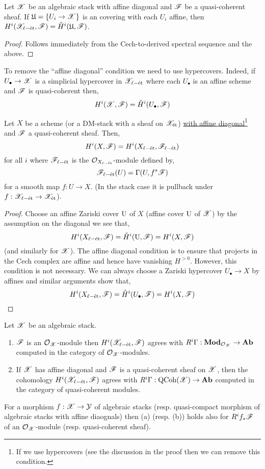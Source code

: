 \documentclass[12pt]{article}
\begin{document}
\begin{prop}
Let $\mathscr{X}$ be an algebraic stack with affine diagonal and $\mathscr{F}$ be a quasi-coherent sheaf. If $\mathfrak{U} = \{U_i \to \mathscr{X} \}$ is an \etale covering with each $U_i$ affine, then $H^i(\mathscr{X}_{\ell-\text{\'{e}t}}, \mathscr{F}) = \check{H}^i(\mathfrak{U}, \mathscr{F})$. 
\end{prop}

\begin{proof}
Follows immediately from the Cech-to-derived spectral sequence and the above. 
\end{proof}

\begin{rmk}
To remove the ``affine diagonal'' condition we need to use hypercovers. Indeed, if $U_\bullet \to \mathscr{X}$ is a simplicial hypercover in $\mathscr{X}_{\ell-\text{\'{e}t}}$ where each $U_\bullet$ is an affine scheme and $\mathscr{F}$ is quasi-coherent then,
\[ H^i(\mathscr{X}, \mathscr{F}) = \check{H}^i(U_\bullet, \mathscr{F}) \]
\end{rmk}

\begin{prop}
Let $X$ be a scheme (or a DM-stack with a sheaf on $\mathscr{X}_{\text{\'{e}t}}$) \ul{with affine diagonal}\footnote{If we use hypercovers (see the discussion in the proof then we can remove this condition.} and $\mathscr{F}$ a quasi-coherent sheaf. Then,
\[ H^i(X, \mathscr{F}) = H^i(X_{\ell-\text{\'{e}t}}, \mathscr{F}_{\ell-\text{\'{e}t}}) \]
for all $i$ where $\mathscr{F}_{\ell-\text{\'{e}t}}$ is the $\mathcal{O}_{X_{\ell-\text{\'{e}t}}}$-module defined by,
\[ \mathscr{F}_{\ell-\text{\'{e}t}}(U) = \Gamma(U, f^* \mathscr{F}) \]
for a smooth map $f : U \to X$. (In the stack case it is pullback under $f : \mathscr{X}_{\ell-\text{\'{e}t}} \to \mathscr{X}_{\text{\'{e}t}}$).
\end{prop}

\begin{proof}
Choose an affine Zariski cover $\mathrm{U}$ of $X$ (affine \etale cover $\mathrm{U}$ of $\mathscr{X}$) by the assumption on the diagonal we see that,
\[ H^i(X_{\ell-\text{\'{e}t}}, \mathscr{F}) = \check{H}^i(\mathrm{U}, \mathscr{F}) = H^i(X, \mathscr{F}) \]
(and similarly for $\mathscr{X}$). The affine diagonal condition is to ensure that projects in the Cech complex are affine and hence have vanishing $H^{>0}$. However, this condition is not necessary. We can always choose a Zariski hypercover $U_\bullet \to X$ by affines and similar arguments show that,
\[ H^i(X_{\ell-\text{\'{e}t}}, \mathscr{F}) = \check{H}^i(U_\bullet, \mathscr{F}) = H^i(X, \mathscr{F}) \]
\end{proof}

\begin{prop}
Let $\mathscr{X}$ be an algebraic stack.
\begin{enumerate}
\item $\mathscr{F}$ is an $\mathcal{O}_{\mathscr{X}}$-module then $H^i(\mathscr{X}_{\ell-\text{\'{e}t}}, \mathscr{F})$ agrees with $R^i \Gamma : \mathbf{Mod}_{\mathcal{O}_{\mathscr{X}}} \to \mathbf{Ab}$ computed in the category of $\mathcal{O}_{\mathscr{X}}$-modules.
\item If $\mathscr{X}$ has affine diagonal and $\mathscr{F}$ is a quasi-coherent sheaf on $\mathscr{X}$, then the cohomology $H^i(\mathscr{X}_{\ell-\text{\'{e}t}}, \mathscr{F})$ agrees with $R^i \Gamma : \mathrm{QCoh}{(\mathscr{X})} \to \mathbf{Ab}$ computed in the category of quasi-coherent modules.
\end{enumerate}
For a morphism $f : \mathscr{X} \to \mathcal{Y}$ of algebraic stacks (resp. quasi-compact morphism of algebraic stacks with affine diaognals) then (a) (resp. (b)) holds also for $R^i f_* \mathscr{F}$ of an $\mathcal{O}_{\mathscr{X}}$-module (resp. quasi-coherent sheaf).
\end{prop}
\end{document}
